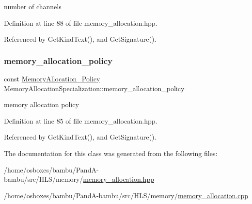 number of channels 



Definition at line 88 of file memory\+\_\+allocation.\+hpp.



Referenced by Get\+Kind\+Text(), and Get\+Signature().

\mbox{\label{classMemoryAllocationSpecialization_a22c638516330fb740737ffb1df4397fb}} 
\subsubsection{\texorpdfstring{memory\+\_\+allocation\+\_\+policy}{memory\_allocation\_policy}}
{\footnotesize\ttfamily const \hyperlink{memory__allocation_8hpp_aad85c6dac5893e8093336373dd19539b}{Memory\+Allocation\+\_\+\+Policy} Memory\+Allocation\+Specialization\+::memory\+\_\+allocation\+\_\+policy}



memory allocation policy 



Definition at line 85 of file memory\+\_\+allocation.\+hpp.



Referenced by Get\+Kind\+Text(), and Get\+Signature().



The documentation for this class was generated from the following files\+:\begin{DoxyCompactItemize}
\item 
/home/osboxes/bambu/\+Pand\+A-\/bambu/src/\+H\+L\+S/memory/\hyperlink{memory__allocation_8hpp}{memory\+\_\+allocation.\+hpp}\item 
/home/osboxes/bambu/\+Pand\+A-\/bambu/src/\+H\+L\+S/memory/\hyperlink{memory__allocation_8cpp}{memory\+\_\+allocation.\+cpp}\end{DoxyCompactItemize}
